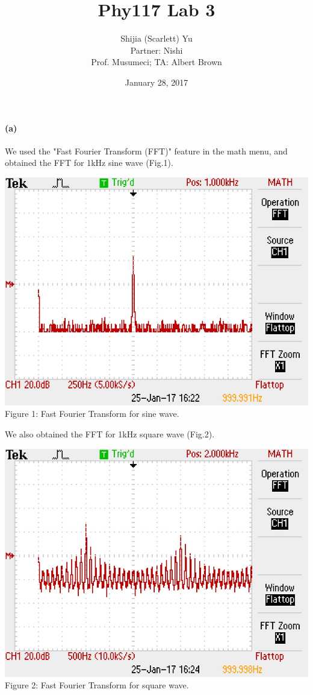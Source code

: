 \documentclass[]{article}
\title{Phy117 Lab 3}
\author{Shijia (Scarlett) Yu \\Partner: Nishi\\Prof. Musumeci; TA: Albert Brown}
\date{January 28, 2017}
\begin{document}
	\maketitle
	\paragraph { (a)} %
	We used the "Fast Fourier Transform (FFT)" feature in the math menu, and obtained the FFT for 1kHz sine wave (Fig.1).
	\begin{center}
		\includegraphics[scale=0.8]{a_sineFFT}\\
		Figure 1: Fast Fourier Transform for sine wave.
	\end{center}
	We also obtained the FFT for 1kHz square wave (Fig.2).
		\begin{center}
			\includegraphics[scale=0.8]{a_squareFFT}\\
			Figure 2: Fast Fourier Transform for square wave.
		\end{center}
\end{document}
